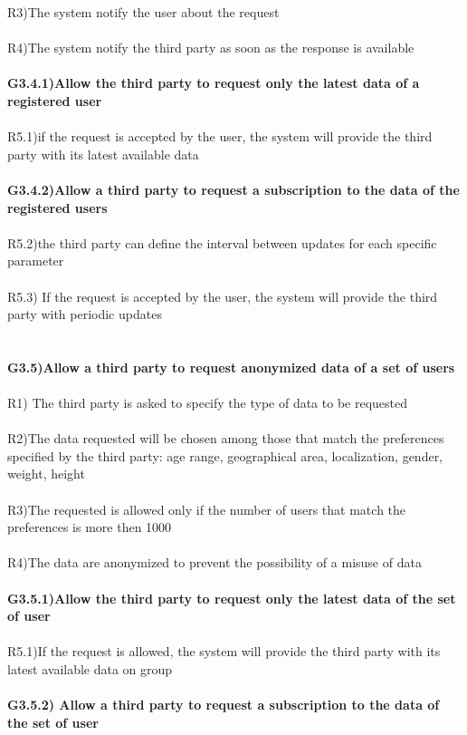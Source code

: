 R3)The system notify the user about the request\\ \\
R4)The system notify the third party as soon as the response is available \\ \\
\textbf{G3.4.1)Allow the third party to request only the latest data of a registered user} \\ \\
R5.1)if the request is accepted by the user, the system will provide the third party with its latest available data \\ \\ 
\textbf{G3.4.2)Allow a third party to request a subscription to the data of the registered users} \\ \\
R5.2)the third party can define the interval between updates for each specific parameter \\ \\
R5.3) If the request is accepted by the user, the system will provide the third party with periodic updates \\ \\ \\
\textbf{G3.5)Allow a third party to request anonymized data of a set of users} \\ \\
R1) The third party is asked to specify the type of data to be requested \\ \\
 R2)The data requested will be chosen among those that match the preferences specified by the third party: age range, geographical area, localization, gender, weight, height \\ \\
R3)The requested is allowed only if the number of users that match the preferences is more then 1000 \\ \\
R4)The data are anonymized to prevent the possibility of a misuse of data \\ \\ 
\textbf{G3.5.1)Allow the third party to request only the latest data of the set of user} \\ \\
R5.1)If the request is allowed, the system will provide the third party with its latest available data on group \\ \\
\textbf{G3.5.2) Allow a third party to request a subscription to the data of the set of user} \\ \\
